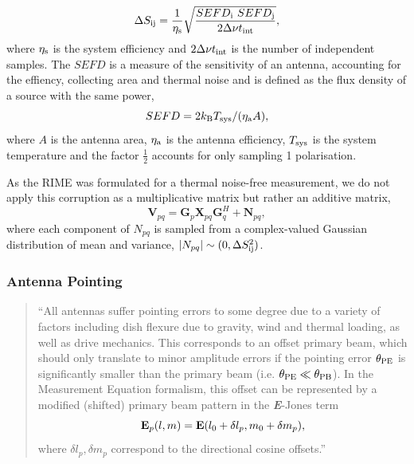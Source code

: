 \begin{equation}
 \Delta S_{\rm ij} = \frac{1}{\eta_{\rm s}}\sqrt{\frac{SEFD_{\rm i}\ SEFD_{\rm j}}{2 \Delta \nu t_{\rm int}}},  
\end{equation}
where $\eta_{\rm s}$ is the system efficiency and $2 \Delta \nu t_{\rm int}$ is the number of independent samples. The $SEFD$ is a measure of the sensitivity of an antenna, accounting for the effiency, collecting area and thermal noise and is defined as the flux density of a source with the same power,
\begin{equation}
 SEFD = 2 k_{\rm B} T_{\rm sys} / (\eta_{\rm a} A),
\end{equation}
where $A$ is the antenna area, $\eta_{\rm a}$ is the antenna efficiency, $T_{\rm sys}$ is the system temperature and the factor $\frac{1}{2}$ accounts for only sampling 1 polarisation.


As the RIME was formulated for a thermal noise-free measurement, we do not apply this corruption as a multiplicative matrix but rather an additive matrix,
\begin{equation}\label{eq:noise_matrix}
\bm{V}_{pq} = \bm G_p \bm{X}_{pq} \bm G_q^H + \bm N_{pq},
\end{equation}
where each component of $N_{pq}$ is sampled from a complex-valued Gaussian distribution of mean and variance, $|N_{pq}| \sim (0, \Delta S_{\rm ij}^2)$.


\subsubsection{Antenna Pointing}

\begin{quotation}
``All antennas suffer pointing errors to some degree due to a variety of factors including dish flexure due to gravity, wind and thermal loading, as well as drive mechanics. This corresponds to an offset primary beam, which should only translate to minor amplitude errors if the pointing error $\theta_{\rm PE}$ is significantly smaller than the primary beam (i.e. $\theta_{\rm PE} \ll \theta_{\rm PB}$). In the Measurement Equation formalism, this offset can be represented by a modified (shifted) primary beam pattern in the {\bf \it E}-Jones term \citep[see][]{Smirnov_2011a}
\begin{equation}
{\bf E}_p(l,m) = {\bf E}(l_0 + \delta l_p, m_0 + \delta m_p),
\end{equation}
where $\delta l_p, \delta m_p$ correspond to the directional cosine offsets.''\\
\citep{Blecher_2016}
\end{quotation}

